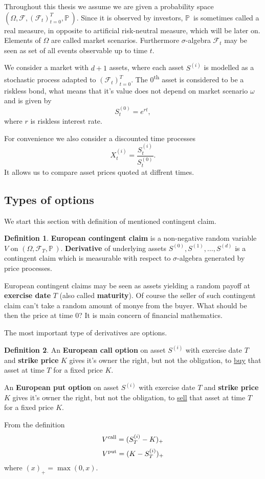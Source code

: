 \documentclass[a4paper,12pt, twoside]{article}
\theoremstyle{definition}
\newtheorem{mydef}{Definition}[section]
\theoremstyle{remark}
\def\P{{\mathbb{P}}\,}
\begin{document}
Throughout this thesis we assume we are given a probability space $(\Omega, \mathcal{F}, (\mathcal{F}_t)_{t=0}^T, \P)$. Since it is observed by investors, $\P$ is sometimes called a real measure, in opposite to artificial risk-neutral measure, which will be later on. Elements of $\Omega$ are called market scenarios. Furthermore $\sigma$-algebra $\mathcal{F}_t$ may be seen as set of all events observable up to time $t$.

We consider a market with $d+1$ assets, where each asset $S^{(i)}$ is modelled as a stochastic process adapted to $(\mathcal{F}_t)_{t=0}^T$. The $0$\textsuperscript{th} asset is considered to be a riskless bond, what means that it's value does not depend on market scenario $\omega$ and is given by 
\[S^{(0)}_t = e^{rt},\]
where $r$ is riskless interest rate.

For convenience we also consider a discounted time processes
\[ X^{(i)}_t = \frac{S^{(i)}_t}{S^{(0)}_t}. \]
It allows us to compare asset prices quoted at diffrent times.


\subsection{Types of options}
We start this section with definition of mentioned contingent claim.
\begin{mydef}
 \label{def:cc_eu}
 \textbf{European contingent claim} is a non-negative random variable $V$ on $(\Omega, \mathcal{F}_T, \P)$. \textbf{Derivative} of underlying assets $S^{(0)}, S^{(1)}, \ldots, S^{(d)}$ is a contingent claim which is measurable with respect to $\sigma$-algebra generated by price processes.
\end{mydef}
European contingent claims may be seen as assets yielding a random payoff at \textbf{exercise date} $T$ (also called \textbf{maturity}). Of course the seller of such contingent claim can't take a random amount of monye from the buyer. What should be then the price at time $0$? It is main concern of financial mathematics.

The most important type of derivatives are options.
\begin{mydef}
 An \textbf{European call option} on asset $S^{(i)}$ with exercise date $T$ and \textbf{strike price} $K$ gives it's owner the right, but not the obligation, to \underline{buy} that asset at time $T$ for a fixed price $K$.
 
 An \textbf{European put option} on asset $S^{(i)}$ with exercise date $T$ and \textbf{strike price} $K$ gives it's owner the right, but not the obligation, to \underline{sell} that asset at time $T$ for a fixed price $K$.
\end{mydef}
From the definition
\begin{equation}
 \label{eq:ecall}
 V\textsuperscript{call} = (S^{(i)}_T - K)_+
\end{equation}
\begin{equation}
 \label{eq:eput}
 V\textsuperscript{put} = (K - S^{(i)}_T )_+
\end{equation}
where $(x)_+ = \max(0,x)$.
\end{document}
